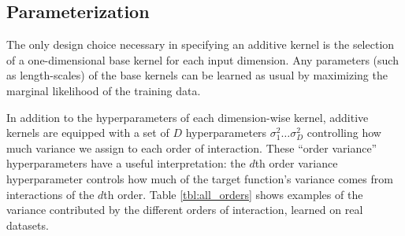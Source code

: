 \subsection{Parameterization}
The only design choice necessary in specifying an additive kernel is the selection of a one-dimensional base kernel for each input dimension.
Any parameters (such as length-scales) of the base kernels can be learned as usual by maximizing the marginal likelihood of the training data.  

In addition to the hyperparameters of each dimension-wise kernel, additive kernels are equipped with a set of $D$ hyperparameters $\sigma_1^2 \dots \sigma_D^2$ controlling how much variance we assign to each order of interaction.
These ``order variance'' hyperparameters have a useful interpretation:  the $d$th order variance hyperparameter controls how much of the target function's variance comes from interactions of the $d$th order.
%
%
%
%
Table \ref{tbl:all_orders} shows examples of the variance contributed by the different orders of interaction, learned on real datasets.

